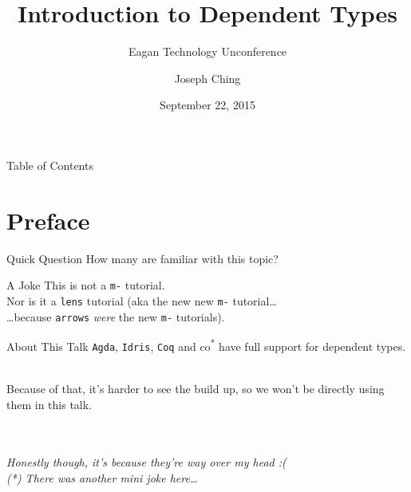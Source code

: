 \documentclass[xcolor={usenames,dvipsnames}]{beamer}
\title{Introduction to Dependent Types}
\subtitle{Eagan Technology Unconference}
\author{Joseph Ching}
\date{September 22, 2015}
\begin{document}
\begin{frame}[plain]
  \titlepage
\end{frame}


\begin{frame}{Table of Contents}
  \tableofcontents[
    pausesections,
    sectionstyle=show,
    subsectionstyle=hide
  ]
\end{frame}


\section{Preface}

\begin{frame}{Quick Question}
  How many are familiar with this topic?
\end{frame}

\begin{frame}{A Joke}
  This is not a \texttt{m-} tutorial.\\
  \pause
  Nor is it a \texttt{lens} tutorial
  \pause
  (aka the new new \texttt{m-} tutorial\ldots\\
  \pause
  \ldots because \texttt{arrows} \textit{were} the new \texttt{m-} tutorials).
\end{frame}


\begin{frame}{About This Talk}
    \texttt{Agda}, \texttt{Idris}, \texttt{Coq} and co\textsuperscript{*} have full support for dependent types.

    \ \\
    \pause
    Because of that, it's harder to see the build up, so we won't be directly using them in this talk.

    \ \\
    \ \\
    \pause
    \textit{\tiny{Honestly though, it's because they're way over my head :(}}\\
    \textit{\tiny{(*) There was another mini joke here\ldots}}
\end{frame}
\end{document}
